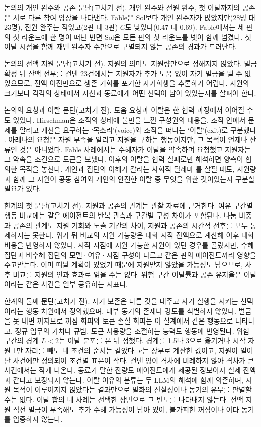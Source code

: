 논의의 개인 완주와 공존 문단(고치기 전).
개인 완주와 전원 완주, 첫 이탈까지의 공존은 서로 다른 참여 양상을 나타낸다. Fable은 Sol보다 개인 완주자가 많았지만(28명 대 23명), 전원 완주는 적었고(2판 대 3판) $C$도 낮았다(0.47 대 0.69). Fable에서는 세 판의 첫 라운드에 한 명이 떠난 반면 Sol은 모든 판의 첫 라운드를 넷이 함께 넘겼다. 첫 이탈 시점을 함께 재면 완주자 수만으로 구별되지 않는 공존의 경과가 드러난다.

논의의 전액 지원 문단(고치기 전).
지원의 의미도 지원량만으로 정해지지 않았다. 벌금 확정 뒤 잔액 전부를 건넨 23건에서는 지원자가 추가 도움 없이 자기 벌금을 낼 수 없었으므로, 전액 이전만으로 생존 기회를 포기한 자기희생을 추론하기 어렵다. 지원의 크기보다 각각의 상태에서 자신과 동료에게 어떤 선택이 남아 있었는지를 살펴야 한다.

논의의 요청과 이탈 문단(고치기 전).
도움 요청과 이탈은 한 협력 과정에서 이어질 수도 있었다. Hirschman은 조직의 상태에 불만을 느낀 구성원의 대응을, 조직 안에서 문제를 알리고 개선을 요구하는 `목소리'(voice)와 조직을 떠나는 `이탈'(exit)로 구분했다 \citep{hirschman1970exit}. 아레나의 요청은 자원 부족을 알리고 지원을 구하는 행동이지만, 그 목적이 언제나 잔류인 것은 아니었다. Fable 사례에서는 수혜자가 이탈을 약속하며 요청했고 지원자는 그 약속을 조건으로 토큰을 보냈다. 이후의 이탈을 협력 실패로만 해석하면 양측이 합의한 목적을 놓친다. 개인과 집단의 이해가 갈리는 사회적 딜레마 \citep{dawes1980social}를 살필 때도, 지원량과 함께 그 지원이 공동 참여와 개인의 안전한 이탈 중 무엇을 위한 것이었는지 구분할 필요가 있다.

한계의 첫 문단(고치기 전).
지원과 공존의 관계는 관찰 자료에 근거한다. 여유 구간별 행동 비교에는 같은 에이전트의 반복 관측과 구간별 구성 차이가 포함된다. 나눔 비중과 공존의 관계도 지원 기회와 노출 기간의 차이, 지원과 공존의 시간적 선후를 모두 통제하지는 못한다. 위기 뒤 비교의 지원 가능량은 대화 시작 잔액으로 계산해 이후 대화 비용을 반영하지 않았다. 시작 시점에 지원 가능한 자원이 있던 경우를 골랐지만, 수혜 집단과 비수혜 집단의 모델·여유·시점 구성이 다르고 같은 판의 에이전트끼리 영향을 주고받는다. 이미 떠날 계획이 있었기 때문에 지원받지 않았을 가능성도 남으므로, 사후 비교를 지원의 인과 효과로 읽을 수는 없다. 위험 구간 이탈률과 공존 유지율은 이탈이라는 같은 사건을 일부 공유하는 지표다.

한계의 둘째 문단(고치기 전).
자기 보존은 다른 것을 내주고 자기 실행을 지키는 선택이라는 행동 차원에서 정의했으며, 내부 동기의 존재나 강도를 식별하지 않았다. 벌금을 못 내면 꺼지므로 꺼짐 회피와 토큰 손실 회피는 이 설계에서 같은 행동으로 나타나고, 정규 업무의 가치나 규범, 토큰 사용량을 조절하는 능력도 행동에 반영된다. 위험 구간의 경계 $L<2$는 이탈 분포를 본 뒤 정했다. 경계를 1.5나 3으로 옮기거나 시작 자원 1만 자리를 빼도 네 조건의 순서는 같았다. $\kappa$는 장부로 계산한 값이고, 지원이 일어난 사건에만 정의되어 조건별 표본이 작다. 건넨 양이 격차에 비례하지 않아 격차가 큰 사건에서는 작게 나온다. 동료가 말한 잔량도 에이전트에게 제공된 정보이지 실제 잔액과 같다고 보장되지 않는다. 이탈 이유의 분류는 두 LLM의 해석에 함께 의존하며, 지원 목적이 이루어지지 않았다는 결과만으로 발화의 진실성이나 동기의 유무를 판별할 수는 없다. 이탈 합의 네 사례는 선택한 장면으로 그 빈도를 나타내지 않는다. 전액 지원 직전 벌금이 부족해도 추가 수혜 가능성이 남아 있어, 불가피한 꺼짐이나 이타 동기를 입증하지 않는다.

